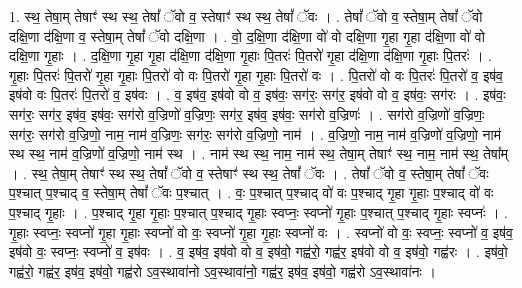 \documentclass[17pt]{extarticle}
\begin{document}
1. स्थ॒ तेषा॒म् तेषाꣳ॑ स्थ स्थ॒ तेषां᳚ ॅवो व॒ स्तेषाꣳ॑ स्थ स्थ॒ तेषां᳚ ॅवः । . तेषां᳚ ॅवो व॒ स्तेषा॒म् तेषां᳚ ॅवो दक्षि॒णा द॑क्षि॒णा व॒ स्तेषा॒म् तेषां᳚ ॅवो दक्षि॒णा । . वो॒ द॒क्षि॒णा द॑क्षि॒णा वो॑ वो दक्षि॒णा गृ॒हा गृ॒हा द॑क्षि॒णा वो॑ वो दक्षि॒णा गृ॒हाः । . द॒क्षि॒णा गृ॒हा गृ॒हा द॑क्षि॒णा द॑क्षि॒णा गृ॒हाः पि॒तरः॑ पि॒तरो॑ गृ॒हा द॑क्षि॒णा द॑क्षि॒णा गृ॒हाः पि॒तरः॑ । . गृ॒हाः पि॒तरः॑ पि॒तरो॑ गृ॒हा गृ॒हाः पि॒तरो॑ वो वः पि॒तरो॑ गृ॒हा गृ॒हाः पि॒तरो॑ वः । . पि॒तरो॑ वो वः पि॒तरः॑ पि॒तरो॑ व॒ इष॑व॒ इष॑वो वः पि॒तरः॑ पि॒तरो॑ व॒ इष॑वः । . व॒ इष॑व॒ इष॑वो वो व॒ इष॑वः॒ सग॑रः॒ सग॑र॒ इष॑वो वो व॒ इष॑वः॒ सग॑रः । . इष॑वः॒ सग॑रः॒ सग॑र॒ इष॑व॒ इष॑वः॒ सग॑रो व॒ज्रिणो॑ व॒ज्रिणः॒ सग॑र॒ इष॑व॒ इष॑वः॒ सग॑रो व॒ज्रिणः॑ । . सग॑रो व॒ज्रिणो॑ व॒ज्रिणः॒ सग॑रः॒ सग॑रो व॒ज्रिणो॒ नाम॒ नाम॑ व॒ज्रिणः॒ सग॑रः॒ सग॑रो व॒ज्रिणो॒ नाम॑ । . व॒ज्रिणो॒ नाम॒ नाम॑ व॒ज्रिणो॑ व॒ज्रिणो॒ नाम॑ स्थ स्थ॒ नाम॑ व॒ज्रिणो॑ व॒ज्रिणो॒ नाम॑ स्थ । . नाम॑ स्थ स्थ॒ नाम॒ नाम॑ स्थ॒ तेषा॒म् तेषाꣳ॑ स्थ॒ नाम॒ नाम॑ स्थ॒ तेषा᳚म् । . स्थ॒ तेषा॒म् तेषाꣳ॑ स्थ स्थ॒ तेषां᳚ ॅवो व॒ स्तेषाꣳ॑ स्थ स्थ॒ तेषां᳚ ॅवः । . तेषां᳚ ॅवो व॒ स्तेषा॒म् तेषां᳚ ॅवः प॒श्चात् प॒श्चाद् व॒ स्तेषा॒म् तेषां᳚ ॅवः प॒श्चात् । . वः॒ प॒श्चात् प॒श्चाद् वो॑ वः प॒श्चाद् गृ॒हा गृ॒हाः प॒श्चाद् वो॑ वः प॒श्चाद् गृ॒हाः । . प॒श्चाद् गृ॒हा गृ॒हाः प॒श्चात् प॒श्चाद् गृ॒हाः स्वप्नः॒ स्वप्नो॑ गृ॒हाः प॒श्चात् प॒श्चाद् गृ॒हाः स्वप्नः॑ । . गृ॒हाः स्वप्नः॒ स्वप्नो॑ गृ॒हा गृ॒हाः स्वप्नो॑ वो वः॒ स्वप्नो॑ गृ॒हा गृ॒हाः स्वप्नो॑ वः । . स्वप्नो॑ वो वः॒ स्वप्नः॒ स्वप्नो॑ व॒ इष॑व॒ इष॑वो वः॒ स्वप्नः॒ स्वप्नो॑ व॒ इष॑वः । . व॒ इष॑व॒ इष॑वो वो व॒ इष॑वो॒ गह्व॑रो॒ गह्व॑र॒ इष॑वो वो व॒ इष॑वो॒ गह्व॑रः । . इष॑वो॒ गह्व॑रो॒ गह्व॑र॒ इष॑व॒ इष॑वो॒ गह्व॑रो ऽव॒स्थावा॑नो ऽव॒स्थावा॑नो॒ गह्व॑र॒ इष॑व॒ इष॑वो॒ गह्व॑रो ऽव॒स्थावा॑नः । \newline
\end{document}
